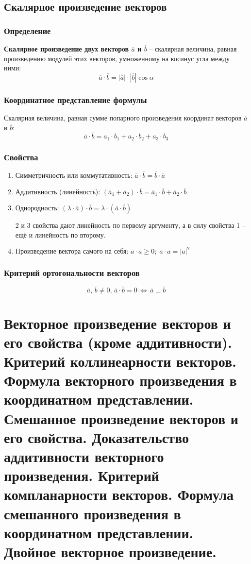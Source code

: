 \documentclass{article}
\begin{document}
\subsection{Скалярное произведение векторов}
\subsubsection{Определение}
\textbf{Скалярное произведение двух векторов $\overline{a}$ и $\overline{b}$} -- скалярная величина, равная
произведению модулей этих векторов, умноженному на косинус угла между ними:
$$\overline{a}\cdot \overline{b} = |\overline{a}|\cdot |\overline{b}| \cos\alpha$$
\subsubsection{Координатное представление формулы}
Скалярная величина, равная сумме попарного произведения координат векторов $\overline{a}$ и $\overline{b}$: $$\overline{a}\cdot\overline{b}=a_1\cdot b_1+a_2\cdot b_2+a_3\cdot b_3$$
\subsubsection{Свойства}
\begin{enumerate}
    \item Симметричность или коммутативность: $\overline{a}\cdot\overline{b}=\overline{b}\cdot\overline{a}$
    \item Аддитивность (линейность): $(\overline{a}_1+\overline{a}_2)\cdot\overline{b}=\overline{a}_1\cdot\overline{b}+\overline{a}_2\cdot\overline{b}$
    \item Однородность: $(\lambda\cdot\overline{a})\cdot\overline{b}=\lambda\cdot(\overline{a}\cdot\overline{b})$

    2 и 3 свойства дают линейность по первому аргументу, а в силу свойства 1 -- ещё и линейность по второму.
    \item Произведение вектора самого на себя: $\overline{a}\cdot\overline{a}\geqslant 0;\;\overline{a}\cdot\overline{a}=|\overline{a}|^2$
\end{enumerate}
\subsubsection{Критерий ортогональности векторов}
$$ \overline{a},\,\overline{b}\neq 0,\,\overline{a}\cdot\overline{b}=0\,\Leftrightarrow\,\overline{a}\perp\overline{b} $$

\newpage
\section{Векторное произведение векторов и его свойства (кроме аддитивности). Критерий коллинеарности векторов. Формула векторного произведения в координатном представлении. Смешанное произведение векторов и его свойства. Доказательство аддитивности векторного произведения. Критерий компланарности векторов. Формула смешанного произведения в координатном представлении. Двойное векторное произведение.}
\end{document}
